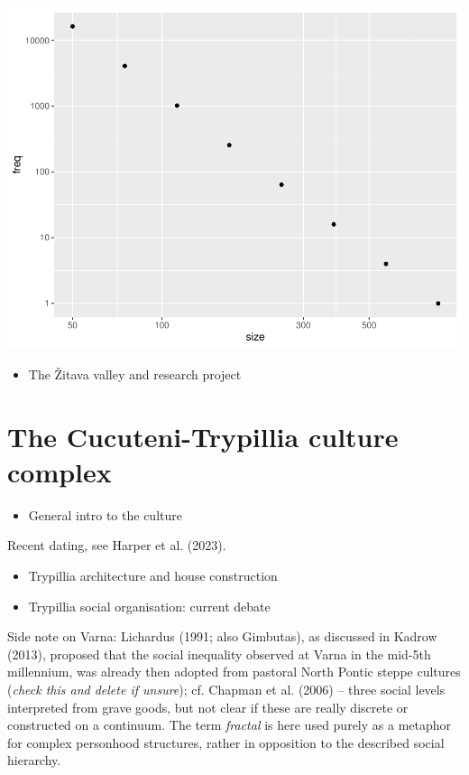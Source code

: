 \documentclass[
  12pt,
]{book}
\providecommand{\tightlist}{%
  \setlength{\itemsep}{0pt}\setlength{\parskip}{0pt}}
\begin{document}
\begin{center}\includegraphics[width=0.7\linewidth]{bookdown-demo_files/figure-latex/unnamed-chunk-1-1} \end{center}

\begin{itemize}
\tightlist
\item
  The Žitava valley and research project
\end{itemize}

\hypertarget{trypillia}{%
\section{The Cucuteni-Trypillia culture complex}\label{trypillia}}

\begin{itemize}
\tightlist
\item
  General intro to the culture
\end{itemize}

Recent dating, see Harper et al. (2023).

\begin{itemize}
\item
  Trypillia architecture and house construction
\item
  Trypillia social organisation: current debate
\end{itemize}

Side note on Varna: Lichardus (1991; also Gimbutas), as discussed in Kadrow (2013), proposed that the social inequality observed at Varna in the mid-5th millennium, was already then adopted from pastoral North Pontic steppe cultures (\emph{check this and delete if unsure}); cf. Chapman et al. (2006) -- three social levels interpreted from grave goods, but not clear if these are really discrete or constructed on a continuum. The term \emph{fractal} is here used purely as a metaphor for complex personhood structures, rather in opposition to the described social hierarchy.
\end{document}
